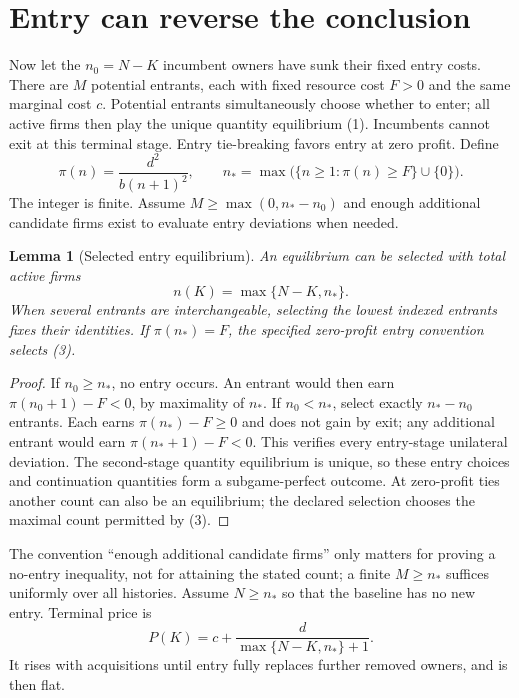 \documentclass[11pt]{article}
\newtheorem{lemma}[theorem]{Lemma}
\theoremstyle{remark}
\begin{document}
\section{Entry can reverse the conclusion}
Now let the $n_0=N-K$ incumbent owners have sunk their fixed entry costs. There are $M$ potential entrants, each with fixed resource cost $F>0$ and the same marginal cost $c$. Potential entrants simultaneously choose whether to enter; all active firms then play the unique quantity equilibrium (1). Incumbents cannot exit at this terminal stage. Entry tie-breaking favors entry at zero profit. Define
\[
 \pi(n)=\frac{d^2}{b(n+1)^2},\qquad
 n_* =\max\bigl(\{n\geq1:\pi(n)\geq F\}\cup\{0\}\bigr).
\]
The integer is finite. Assume $M\geq\max(0,n_*-n_0)$ and enough additional candidate firms exist to evaluate entry deviations when needed.

\begin{lemma}[Selected entry equilibrium]
An equilibrium can be selected with total active firms
\[
 n(K)=\max\{N-K,n_*\}.                                  \tag{3}
\]
When several entrants are interchangeable, selecting the lowest indexed entrants fixes their identities. If $\pi(n_*)=F$, the specified zero-profit entry convention selects (3).
\end{lemma}
\begin{proof}
If $n_0\geq n_*$, no entry occurs. An entrant would then earn $\pi(n_0+1)-F<0$, by maximality of $n_*$. If $n_0<n_*$, select exactly $n_*-n_0$ entrants. Each earns $\pi(n_*)-F\geq0$ and does not gain by exit; any additional entrant would earn $\pi(n_*+1)-F<0$. This verifies every entry-stage unilateral deviation. The second-stage quantity equilibrium is unique, so these entry choices and continuation quantities form a subgame-perfect outcome. At zero-profit ties another count can also be an equilibrium; the declared selection chooses the maximal count permitted by (3).
\end{proof}

The convention ``enough additional candidate firms'' only matters for proving a no-entry inequality, not for attaining the stated count; a finite $M\geq n_*$ suffices uniformly over all histories. Assume $N\geq n_*$ so that the baseline has no new entry. Terminal price is
\[
 P(K)=c+\frac{d}{\max\{N-K,n_*\}+1}.                     \tag{4}
\]
It rises with acquisitions until entry fully replaces further removed owners, and is then flat.
\end{document}
